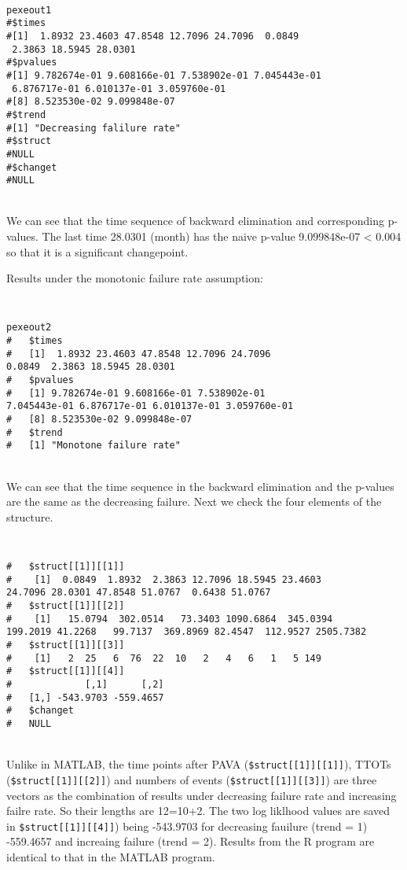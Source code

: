 \documentclass[12pt] {article}
\newenvironment{boxit}{\begin{lrbox}{\savepar}
\begin{minipage}[b]{5.5in}}
{\end{minipage}\end{lrbox}\fbox{\usebox{\savepar}}}
\begin{document}
\begin{boxit} {\tt
\noindent
\begin{verbatim}
pexeout1
#$times
#[1]  1.8932 23.4603 47.8548 12.7096 24.7096  0.0849
 2.3863 18.5945 28.0301
#$pvalues
#[1] 9.782674e-01 9.608166e-01 7.538902e-01 7.045443e-01
 6.876717e-01 6.010137e-01 3.059760e-01
#[8] 8.523530e-02 9.099848e-07
#$trend
#[1] "Decreasing falilure rate"
#$struct
#NULL
#$changet
#NULL
\end{verbatim}}
\end{boxit} \\
We can see that the time sequence of backward elimination and corresponding p-values. The last time 28.0301 (month) has the naive p-value 9.099848e-07 < 0.004 so that it is a significant changepoint.
\newpage

Results under the monotonic failure rate assumption:

\begin{boxit} {\tt
\noindent
\begin{verbatim}
pexeout2
#	$times
#	[1]  1.8932 23.4603 47.8548 12.7096 24.7096
0.0849  2.3863 18.5945 28.0301
#	$pvalues
#	[1] 9.782674e-01 9.608166e-01 7.538902e-01
7.045443e-01 6.876717e-01 6.010137e-01 3.059760e-01
#	[8] 8.523530e-02 9.099848e-07
#	$trend
#	[1] "Monotone failure rate"
\end{verbatim}}
\end{boxit} \\
We can see that the time sequence in the backward elimination and the
p-values are the same as the decreasing failure. Next we check the four elements of the structure.

\begin{boxit} {\tt
\noindent
\begin{verbatim}
#	$struct[[1]][[1]]
#	 [1]  0.0849  1.8932  2.3863 12.7096 18.5945 23.4603
24.7096 28.0301 47.8548 51.0767  0.6438 51.0767
#	$struct[[1]][[2]]
#	 [1]   15.0794  302.0514   73.3403 1090.6864  345.0394
199.2019 41.2268   99.7137  369.8969 82.4547  112.9527 2505.7382
#	$struct[[1]][[3]]
#	 [1]   2  25   6  76  22  10   2   4   6   1   5 149
#	$struct[[1]][[4]]
#	          [,1]      [,2]
#	[1,] -543.9703 -559.4657
#	$changet
#	NULL
\end{verbatim}}
\end{boxit} \\
Unlike in MATLAB, the time points after PAVA ({\tt \$struct[[1]][[1]]}), TTOTs ({\tt \$struct[[1]][[2]]}) and numbers of events ({\tt \$struct[[1]][[3]]}) are three vectors as the combination of results under decreasing failure rate and increasing failre rate. So their lengths are 12=10+2. The two log liklhood values are saved in {\tt \$struct[[1]][[4]]}) being -543.9703 for decreasing fauilure (trend = 1) -559.4657 and increaing failure (trend = 2). Results from the R program are identical to that in the MATLAB program.
\end{document}

